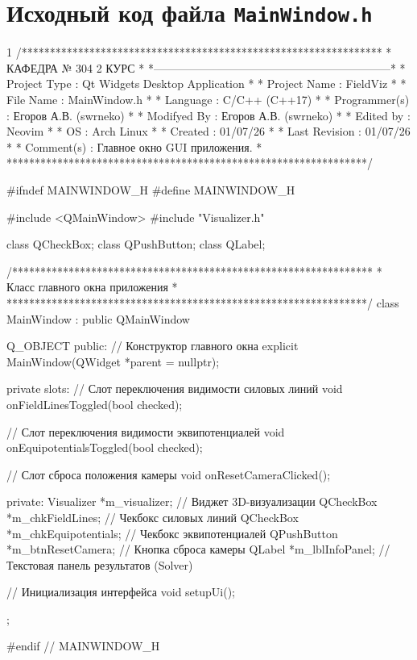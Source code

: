 \section{Исходный код файла \texttt{MainWindow.h}}
\footnotesize
\begin{listing}{1}
/****************************************************************
*                     КАФЕДРА № 304 2 КУРС                       *
*---------------------------------------------------------------*
* Project Type  : Qt Widgets Desktop Application                *
* Project Name  : FieldViz                                      *
* File Name     : MainWindow.h                                   *
* Language      : C/C++ (C++17)                                  *
* Programmer(s) : Егоров А.В. (swrneko)                          *
* Modifyed By   : Егоров А.В. (swrneko)                          *
* Edited by     : Neovim                                         *
* OS            : Arch Linux                                     *
* Created       : 01/07/26                                       *
* Last Revision : 01/07/26                                       *
* Comment(s)    : Главное окно GUI приложения.                   *
****************************************************************/

#ifndef MAINWINDOW_H
#define MAINWINDOW_H

#include <QMainWindow>
#include "Visualizer.h"

class QCheckBox;
class QPushButton;
class QLabel;

/****************************************************************
* Класс главного окна приложения                                *
****************************************************************/
class MainWindow : public QMainWindow {
  Q_OBJECT
public:
  // Конструктор главного окна
  explicit MainWindow(QWidget *parent = nullptr);

private slots:
  // Слот переключения видимости силовых линий
  void onFieldLinesToggled(bool checked);

  // Слот переключения видимости эквипотенциалей
  void onEquipotentialsToggled(bool checked);

  // Слот сброса положения камеры
  void onResetCameraClicked();

private:
  Visualizer *m_visualizer;       // Виджет 3D-визуализации
  QCheckBox *m_chkFieldLines;     // Чекбокс силовых линий
  QCheckBox *m_chkEquipotentials; // Чекбокс эквипотенциалей
  QPushButton *m_btnResetCamera;  // Кнопка сброса камеры
  QLabel *m_lblInfoPanel;         // Текстовая панель результатов (Solver)

  // Инициализация интерфейса
  void setupUi();
};

#endif // MAINWINDOW_H

\end{listing}
\normalsize
\pagebreak
